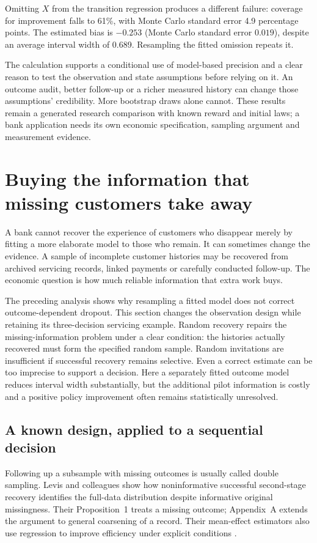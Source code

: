 Omitting $X$ from the transition regression produces a different failure:
coverage for improvement falls to 61\%, with Monte Carlo standard error
4.9 percentage points. The estimated bias is $-0.253$ (Monte Carlo standard
error $0.019$), despite an average interval width of 0.689.
Resampling the fitted omission repeats it.

The calculation supports a conditional use of model-based precision and a
clear reason to test the observation and state assumptions before relying
on it. An outcome audit, better follow-up or a richer measured history can
change those assumptions' credibility. More bootstrap draws alone cannot.
These results remain a generated research comparison with known reward
and initial laws; a bank application needs its own economic specification,
sampling argument and measurement evidence.

\section{Buying the information that missing customers take away}
\label{closure30:outcome-audit}

A bank cannot recover the experience of customers who disappear merely by
fitting a more elaborate model to those who remain. It can sometimes change
the evidence. A sample of incomplete customer histories may be recovered from
archived servicing records, linked payments or carefully conducted follow-up.
The economic question is how much reliable information that extra work buys.

The preceding analysis shows why resampling a fitted model does not correct
outcome-dependent dropout. This section changes the observation design while
retaining its three-decision servicing example.
Random recovery repairs the missing-information problem under a clear
condition: the histories actually recovered must form the specified random
sample. Random invitations are insufficient if successful recovery remains
selective. Even a correct estimate can be too imprecise to support a decision.
Here a separately fitted outcome model reduces interval width substantially,
but the additional pilot information is costly and a positive policy
improvement often remains statistically unresolved.

\subsection{A known design, applied to a sequential decision}
Following up a subsample with missing outcomes is usually called double
sampling. Levis and colleagues show how noninformative successful second-stage
recovery identifies the full-data distribution despite informative original
missingness. Their Proposition~1 treats a missing outcome; Appendix~A extends
the argument to general coarsening of a record. Their mean-effect estimators
also use regression to improve efficiency under explicit conditions
\citep{levis2023double}.

